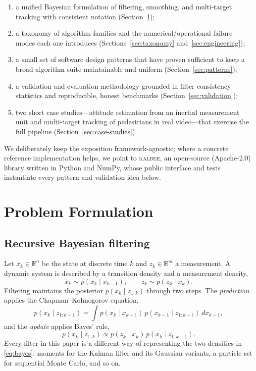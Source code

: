\documentclass[10pt,conference]{IEEEtran}
\newcommand{\toolkit}{\textsc{kalbee}}
\begin{document}
\begin{enumerate}
\item a unified Bayesian formulation of filtering, smoothing, and multi-target
tracking with consistent notation (Section~\ref{sec:formulation});
\item a taxonomy of algorithm families and the numerical/operational failure
modes each one introduces (Sections~\ref{sec:taxonomy}
and~\ref{sec:engineering});
\item a small set of software design patterns that have proven sufficient to
keep a broad algorithm suite maintainable and uniform
(Section~\ref{sec:patterns});
\item a validation and evaluation methodology grounded in filter consistency
statistics and reproducible, honest benchmarks (Section~\ref{sec:validation});
\item two short case studies---attitude estimation from an inertial
measurement unit and multi-target tracking of pedestrians in real video---that
exercise the full pipeline (Section~\ref{sec:case-studies}).
\end{enumerate}

We deliberately keep the exposition framework-agnostic; where a concrete
reference implementation helps, we point to \toolkit{}, an open-source
(Apache-2.0) library written in Python and NumPy, whose public interface and
tests instantiate every pattern and validation idea below.

\section{Problem Formulation}
\label{sec:formulation}

\subsection{Recursive Bayesian filtering}

Let $x_k \in \mathbb{R}^n$ be the state at discrete time $k$ and $z_k \in
\mathbb{R}^m$ a measurement. A dynamic system is described by a transition
density and a measurement density,
\begin{equation}
x_k \sim p(x_k \mid x_{k-1}), \qquad
z_k \sim p(z_k \mid x_k).
\end{equation}
Filtering maintains the posterior $p(x_k \mid z_{1:k})$ through two steps.
The \emph{prediction} applies the Chapman--Kolmogorov equation,
\begin{equation}
p(x_k \mid z_{1:k-1}) = \int p(x_k \mid x_{k-1})\,
p(x_{k-1} \mid z_{1:k-1})\, dx_{k-1},
\end{equation}
and the \emph{update} applies Bayes' rule,
\begin{equation}
p(x_k \mid z_{1:k}) \propto p(z_k \mid x_k)\,
p(x_k \mid z_{1:k-1}).
\label{eq:bayes}
\end{equation}
Every filter in this paper is a different way of representing the two
densities in \eqref{eq:bayes}: moments for the Kalman filter and its
Gaussian variants, a particle set for sequential Monte Carlo, and so on.
\end{document}
